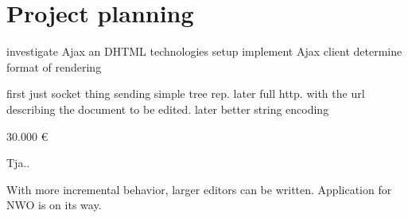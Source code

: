 \documentclass[10pt]{article}
\begin{document}
\section{Project planning}



investigate Ajax an DHTML technologies
setup implement Ajax client
determine format of rendering

first just socket thing
sending simple tree rep.
later full http. with the url describing the document to be edited.
later better string encoding


30.000 \euro



Tja..


With more incremental behavior, larger editors can be written. Application for NWO is on its way.





\end{document}
